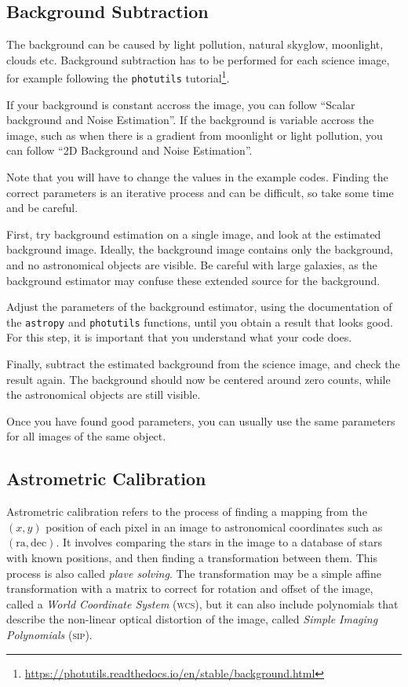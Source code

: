 \documentclass[a4paper, 11pt, fleqn]{memoir}
\begin{document}
\subsection{Background Subtraction}
\label{ssec:background-subtraction}

The background can be caused by light pollution, natural skyglow, moonlight, clouds etc.
Background subtraction has to be performed for each science image, for example following the \texttt{photutils} tutorial\footnote{\url{https://photutils.readthedocs.io/en/stable/background.html}}.

If your background is constant accross the image, you can follow \enquote{Scalar background and Noise Estimation}.
If the background is variable accross the image, such as when there is a gradient from moonlight or light pollution, you can follow \enquote{2D Background and Noise Estimation}.

Note that you will have to change the values in the example codes.
Finding the correct parameters is an iterative process and can be difficult, so take some time and be careful.

First, try background estimation on a single image, and look at the estimated background image.
Ideally, the background image contains only the background, and no astronomical objects are visible.
Be careful with large galaxies, as the background estimator may confuse these extended source for the background.

Adjust the parameters of the background estimator, using the documentation of the \texttt{astropy} and \texttt{photutils} functions, until you obtain a result that looks good.
For this step, it is important that you understand what your code does.

Finally, subtract the estimated background from the science image, and check the result again.
The background should now be centered around zero counts, while the astronomical objects are still visible.

Once you have found good parameters, you can usually use the same parameters for all images of the same object.

\subsection{Astrometric Calibration}
\label{ssec:astrometric-calibration}

Astrometric calibration refers to the process of finding a mapping from the $(x,y)$ position of each pixel in an image to astronomical coordinates such as $(\text{ra}, \text{dec})$.
It involves comparing the stars in the image to a database of stars with known positions, and then finding a transformation between them.
This process is also called \emph{plave solving}.
The transformation may be a simple affine transformation with a matrix to correct for rotation and offset of the image, called a \emph{World Coordinate System} (\textsc{wcs}), but it can also include polynomials that describe the non-linear optical distortion of the image, called \emph{Simple Imaging Polynomials} (\textsc{sip}).
\end{document}

